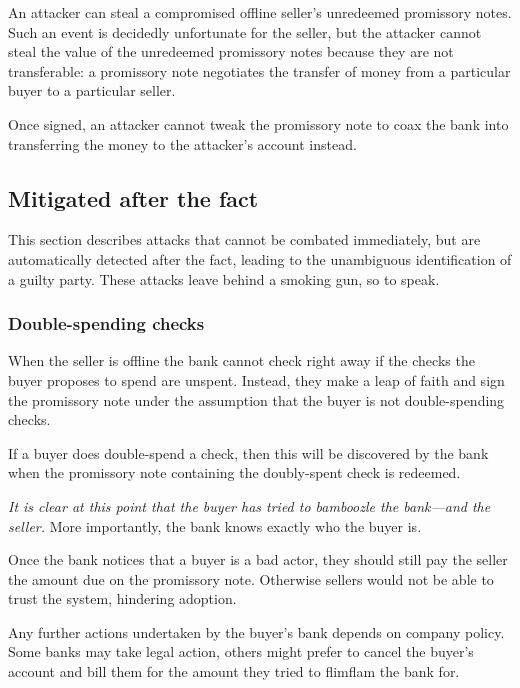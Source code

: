 \documentclass[12pt,a4paper]{article}
\begin{document}
\begin{multicols}{2}
	An attacker can steal a compromised offline seller's unredeemed promissory notes. Such an event is decidedly unfortunate for the seller, but the attacker cannot steal the value of the unredeemed promissory notes because they are not transferable: a promissory note negotiates the transfer of money from a particular buyer to a particular seller. 

	Once signed, an attacker cannot tweak the promissory note to coax the bank into transferring the money to the attacker's account instead.

	\subsection{Mitigated after the fact}

	This section describes attacks that cannot be combated immediately, but are automatically detected after the fact, leading to the unambiguous identification of a guilty party. These attacks leave behind a smoking gun, so to speak.

	\subsubsection{Double-spending checks}
	\label{sec:double-spending-checks}

	When the seller is offline the bank cannot check right away if the checks the buyer proposes to spend are unspent. Instead, they make a leap of faith and sign the promissory note under the assumption that the buyer is not double-spending checks.

	If a buyer does double-spend a check, then this will be discovered by the bank when the promissory note containing the doubly-spent check is redeemed.

	\emph{It is clear at this point that the buyer has tried to bamboozle the bank---and the seller.}  More importantly, the bank knows exactly who the buyer is.

	Once the bank notices that a buyer is a bad actor, they should still pay the seller the amount due on the promissory note. Otherwise sellers would not be able to trust the system, hindering adoption.
	
	Any further actions undertaken by the buyer's bank depends on company policy. Some banks may take legal action, others might prefer to cancel the buyer's account and bill them for the amount they tried to flimflam the bank for.


\end{multicols}
\end{document}
